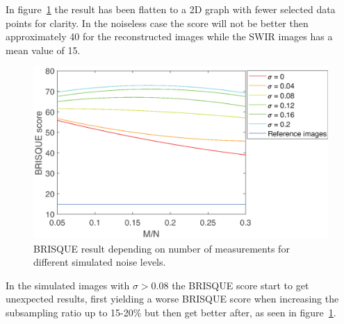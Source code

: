 In figure~\ref{fig:Brisque_2d} the result has been flatten to a 2D graph with fewer selected data points for clarity. In the noiseless case the score will not be better then approximately 40 for the reconstructed images while the SWIR images has a mean value of 15.


\begin{figure}[H]
    \centering
    \includegraphics[width = 0.95\linewidth]{result/synt_brisque/Brisque_fit_flat3.eps}
    \caption{BRISQUE result depending on number of measurements for different simulated noise levels.}
    \label{fig:Brisque_2d}
\end{figure}

In the simulated images with $\sigma > 0.08$ the BRISQUE score start to get unexpected results, first yielding a worse BRISQUE score when increasing the subsampling ratio up to 15-20\%  but then get better after, as seen in figure~\ref{fig:Brisque_2d}.
